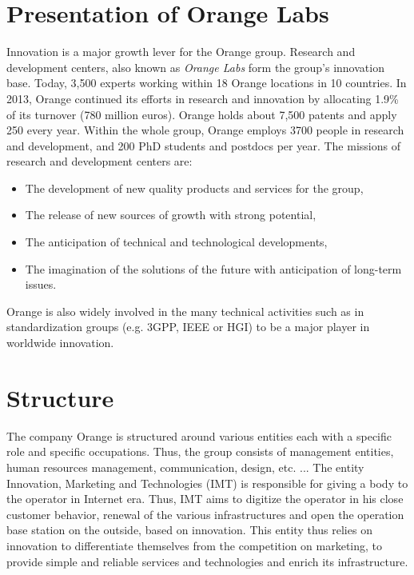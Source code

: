 
\section{Presentation of Orange Labs}
Innovation is a major growth lever for the Orange group. Research and development centers, also known as \textit{Orange Labs} form the group's innovation base. Today, 3,500 experts working within 18 Orange locations in 10 countries. In 2013, Orange continued its efforts in research and innovation by allocating 1.9\% of its turnover (780 million euros). Orange holds about 7,500 patents and apply 250 every year. Within the whole group, Orange employs 3700 people in research and development, and 200 PhD students and postdocs per year. The missions of research and development centers are:

\begin{itemize}
	\item The development of new quality products and services for the group,
	\item The release of new sources of growth with strong potential,
	\item The anticipation of technical and technological developments,
 	\item The imagination of the solutions of the future with anticipation of long-term issues.
\end{itemize}

Orange is also widely involved in the many technical activities such as in standardization groups (e.g. 3GPP, IEEE or HGI) to be a major player in worldwide innovation.

\section{Structure}
The company Orange is structured around various entities each with a specific role and specific occupations. Thus, the group consists of management entities, human resources management, communication, design, etc. ... The entity Innovation, Marketing and Technologies (IMT) is responsible for giving a body to the operator in Internet era. Thus, IMT aims to digitize the operator in his close customer behavior, renewal of the various infrastructures and open the operation base station on the outside, based on innovation. This entity thus relies on innovation to differentiate themselves from the competition on marketing, to provide simple and reliable services and technologies and enrich its infrastructure.

